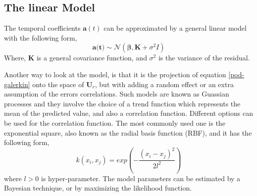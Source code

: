 \documentclass{anstrans}
\begin{document}
\subsection{The linear Model}
The temporal coefficients $\textbf{a}(t)$ can be approximated by a general linear model with the following form,  
    \begin{equation}
    \textbf{a(t)} \sim \mathcal{N} ({\boldsymbol{\beta}}, \textbf{K}+ \sigma^2I)
    \end{equation}
Where, $\textbf{K}$ is a general covariance function, and $\sigma^2$ is the variance of the residual.

Another way to look at the model, is that it is the projection of equation \ref{pod-galerkin} onto the space of $\textbf{U}_r$, but with adding a random effect or an extra assumption of the errors correlations.
Such models are known as Guassian processes \cite{rasmussen2003gaussian} and they involve the choice of a trend function which represents the mean of the predicted value, and also a correlation function. 
Different options can be used for the correlation function. The most commonly used one is the exponential square, also known as the radial basis function (RBF), and it has the following form,
 \begin{equation}
  k(x_i, x_j) =  exp(-\frac{(x_i - x_j)^2}{2l^2})
\end{equation}
where $l > 0$ is hyper-parameter. The model parameters can be estimated by a Bayesian technique, or by maximizing the likelihood function.
\end{document}
